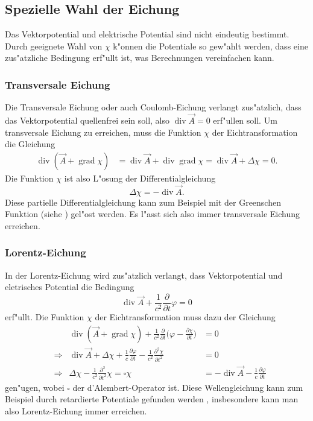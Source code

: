 \subsection{Spezielle Wahl der Eichung}
Das Vektorpotential und elektrische Potential sind nicht eindeutig bestimmt.
Durch geeignete Wahl von $\chi$ k"onnen die Potentiale so gew"ahlt
werden, dass eine zus"atzliche Bedingung erf"ullt ist, was Berechnungen
vereinfachen kann.

\subsubsection{Transversale Eichung}

Die Transversale Eichung oder auch Coulomb-Eichung verlangt zus"atzlich,
dass das Vektorpotential quellenfrei sein soll,
also $\operatorname{div}\vec A=0$ erf"ullen soll.
Um transversale Eichung zu erreichen, muss die Funktion $\chi$
der Eichtransformation die Gleichung
\begin{align*}
\operatorname{div}(\vec A+\operatorname{grad}\chi)
&=
\operatorname{div}\vec A + \operatorname{div}\operatorname{grad}\chi
=
\operatorname{div}\vec A + \Delta\chi
=0.
\end{align*}
Die Funktion $\chi$ ist also L"osung der Differentialgleichung
\[
\Delta \chi = -\operatorname{div}\vec A.
\]
Diese partielle Differentialgleichung kann zum Beispiel mit der
Greenschen Funktion (siehe \cite[p.~33]{skript:evans}) gel"ost werden.
Es l"asst sich also immer transversale Eichung erreichen.

\subsubsection{Lorentz-Eichung}
In der Lorentz-Eichung wird zus"atzlich verlangt, dass Vektorpotential
und eletrisches Potential die Bedingung
\[
\operatorname{div}\vec A+\frac1{c^2}\frac{\partial}{\partial t}\varphi=0
\]
erf"ullt.
Die Funktion $\chi$ der Eichtransformation muss dazu der Gleichung
\begin{equation*}
\begin{aligned}
&&
\operatorname{div}(\vec A+\operatorname{grad}\chi)
+
\frac1{c^2}\frac{\partial}{\partial t}
\biggl(\varphi-\frac{\partial\chi}{\partial t}\biggr)
&=0
\\
&\Rightarrow&
\operatorname{div}\vec A +\Delta\chi
+
\frac{1}{c}\frac{\partial\varphi}{\partial t}
-
\frac1{c^2}\frac{\partial^2\chi}{\partial t^2}
&=0
\\
&\Rightarrow&
\Delta\chi-\frac1{c^2}\frac{\partial^2}{\partial t^2}\chi
=
\square\chi
&=
-\operatorname{div}\vec A-\frac1{c}\frac{\partial\varphi}{\partial t}
\end{aligned}
\end{equation*}
gen"ugen, wobei $\square$ der d'Alembert-Operator ist.
Diese Wellengleichung kann zum Beispiel durch retardierte Potentiale 
gefunden werden \cite[p.~82]{skript:evans}, insbesondere kann man also
Lorentz-Eichung immer erreichen.

